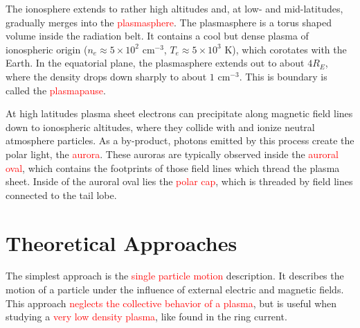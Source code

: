 \documentclass[12pt,a4paper]{article}
\begin{document}
The ionosphere extends to rather high altitudes and, at low- and mid-latitudes, gradually merges into the  \textcolor{red}{plasmasphere}. The plasmasphere is a torus shaped volume inside the radiation belt. It contains a cool but dense plasma of ionospheric origin ($n_e \approx 5 \times 10^2$ cm$^{-3}$, $T_e \approx 5\times 10^3$ K), which corotates with the Earth. In the equatorial plane, the plasmasphere extends out to about $4 R_E$, where the density drops down sharply to about $1$ cm$^{-3}$. This is boundary is called the \textcolor{red}{plasmapause}.

At high latitudes plasma sheet electrons can precipitate along magnetic field lines down to ionospheric altitudes, where they collide with and ionize neutral atmosphere particles. As a by-product, photons emitted by this process create the polar light, the \textcolor{red}{aurora}. These auroras are typically observed inside the  \textcolor{red}{auroral oval}, which contains the footprints of those field lines which thread the plasma sheet. Inside of the auroral oval lies the  \textcolor{red}{polar cap}, which is threaded by field lines connected to the tail lobe.
















































\section{Theoretical Approaches}
\cite{1996bspp.book.....B} The simplest approach is the \textcolor{red}{single particle motion} description. It describes the motion of a particle under the influence of external electric and magnetic fields. This approach \textcolor{red}{neglects the collective behavior of a plasma}, but is useful when studying a \textcolor{red}{very low density plasma}, like found in the ring current.
\end{document}
